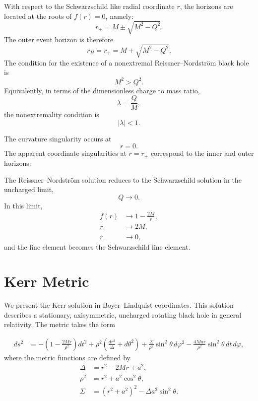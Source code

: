 With respect to the Schwarzschild like radial coordinate \(r\), the horizons are located at the roots of \(f(r)=0\), namely:
\begin{equation}
r_{\pm} = M \pm \sqrt{M^2-Q^2}.
\end{equation}
The outer event horizon is therefore
\begin{equation}
r_H = r_+ = M+\sqrt{M^2-Q^2}.
\end{equation}
The condition for the existence of a nonextremal Reissner--Nordstr\"om black hole is
\begin{equation}
M^2 > Q^2 .
\end{equation}
Equivalently, in terms of the dimensionless charge to mass ratio,
\begin{equation}
\lambda = \frac{Q}{M},
\end{equation}
the nonextremality condition is
\begin{equation}
|\lambda| < 1 .
\end{equation}

The curvature singularity occurs at
\begin{equation}
r=0.
\end{equation}
The apparent coordinate singularities at \(r=r_{\pm}\) correspond to the inner and outer horizons.

The Reissner--Nordstr\"om solution reduces to the Schwarzschild solution in the uncharged limit,
\begin{equation}
Q \to 0 .
\end{equation}
In this limit,
\begin{align}
f(r) &\to 1-\frac{2M}{r}, \\
r_+ &\to 2M, \\
r_- &\to 0,
\end{align}
and the line element becomes the Schwarzschild line element.

\section{Kerr Metric}
\label{sec:appx:KerrBH}

We present the Kerr solution in Boyer--Lindquist coordinates. This solution describes a stationary, axisymmetric, uncharged rotating black hole in general relativity. The metric takes the form

\begin{align}
ds^2 &=
-\left(1-\frac{2Mr}{\rho^2}\right)dt^2
+\rho^2\left(\frac{dr^2}{\Delta}+d\theta^2\right)
+\frac{\Sigma}{\rho^2}\sin^2\theta\,d\varphi^2
-\frac{4Mar}{\rho^2}\sin^2\theta\,dt\,d\varphi ,
\end{align}
where the metric functions are defined by
\begin{align}
\Delta &= r^2 - 2Mr + a^2, \\
\rho^2 &= r^2 + a^2\cos^2\theta, \\
\Sigma &= \left(r^2+a^2\right)^2-\Delta a^2\sin^2\theta .
\end{align}

